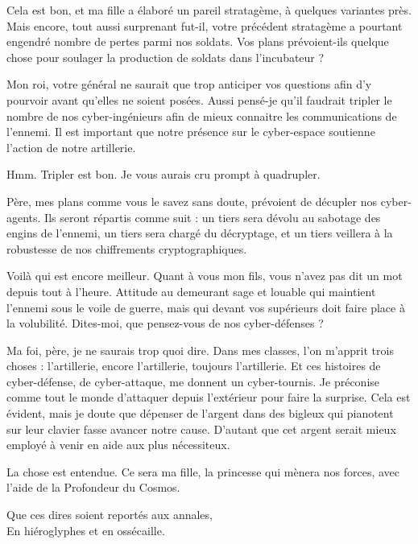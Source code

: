 \begin{drama}
  \roispeaks Cela est bon, et ma fille a élaboré un pareil stratagème, à quelques variantes près. Mais encore, tout aussi surprenant fut-il, votre précédent stratagème a pourtant engendré nombre de pertes parmi nos soldats. Vos plans prévoient-ils quelque chose pour soulager la production de soldats dans l’incubateur ?

  \generalspeaks Mon roi, votre général ne saurait que trop anticiper vos questions afin d’y pourvoir avant qu’elles ne soient posées. Aussi pensé-je qu’il faudrait tripler le nombre de nos cyber-ingénieurs afin de mieux connaitre les communications de l’ennemi. Il est important que notre présence sur le cyber-espace soutienne l’action de notre artillerie.

  \roispeaks Hmm. Tripler est bon. Je vous aurais cru prompt à quadrupler.

  \princessespeaks Père, mes plans comme vous le savez sans doute, prévoient de décupler nos cyber-agents. Ils seront répartis comme suit : un tiers sera dévolu au sabotage des engins de l’ennemi, un tiers sera chargé du décryptage, et un tiers veillera à la robustesse de nos chiffrements cryptographiques.


  \roispeaks Voilà qui est encore meilleur. Quant à vous mon fils, vous n’avez pas dit un mot depuis tout à l’heure. Attitude au demeurant sage et louable qui maintient l’ennemi sous le voile de guerre, mais qui devant vos supérieurs doit faire place à la volubilité. Dites-moi, que pensez-vous de nos cyber-défenses ?

  \elenaspeaks Ma foi, père, je ne saurais trop quoi dire. Dans mes classes, l’on m’apprit trois choses : l’artillerie, encore l’artillerie, toujours l’artillerie. Et ces histoires de cyber-défense, de cyber-attaque, me donnent un cyber-tournis. Je préconise comme tout le monde d’attaquer depuis l’extérieur pour faire la surprise. Cela est évident, mais je doute que dépenser de l’argent dans des bigleux qui pianotent sur leur clavier fasse avancer notre cause. D’autant que cet argent serait mieux employé à venir en aide aux plus nécessiteux.

  \roispeaks La chose est entendue. Ce sera ma fille, la princesse \princesse{} qui mènera nos forces, avec l’aide de la Profondeur du Cosmos.

  \begin{minipage}[t]{\linewidth}
    Que ces dires soient reportés aux annales,\\
    En hiéroglyphes et en ossécaille.
  \end{minipage}


\end{drama}

